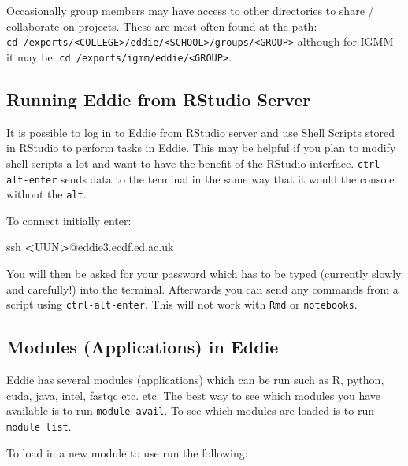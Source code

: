 \documentclass[]{book}
\newenvironment{Shaded}{\begin{snugshade}}{\end{snugshade}}
\newcommand{\FunctionTok}[1]{\textcolor[rgb]{0.00,0.00,0.00}{#1}}
\newcommand{\NormalTok}[1]{#1}
\newcommand{\OperatorTok}[1]{\textcolor[rgb]{0.81,0.36,0.00}{\textbf{#1}}}
\begin{document}
Occasionally group members may have access to other directories to share / collaborate on projects. These are most often found at the path: \texttt{cd\ /exports/\textless{}COLLEGE\textgreater{}/eddie/\textless{}SCHOOL\textgreater{}/groups/\textless{}GROUP\textgreater{}} although for IGMM it may be: \texttt{cd\ /exports/igmm/eddie/\textless{}GROUP\textgreater{}}.

\hypertarget{running-eddie-from-rstudio-server}{%
\subsection{Running Eddie from RStudio Server}\label{running-eddie-from-rstudio-server}}

It is possible to log in to Eddie from RStudio server and use Shell Scripts stored in RStudio to perform tasks in Eddie. This may be helpful if you plan to modify shell scripts a lot and want to have the benefit of the RStudio interface. \texttt{ctrl-alt-enter} sends data to the terminal in the same way that it would the console without the \texttt{alt}.

To connect initially enter:

\begin{Shaded}
\begin{Highlighting}[]
\FunctionTok{ssh} \OperatorTok{<}\NormalTok{UUN}\OperatorTok{>}\NormalTok{@eddie3.ecdf.ed.ac.uk}
\end{Highlighting}
\end{Shaded}

You will then be asked for your password which has to be typed (currently slowly and carefully!) into the terminal. Afterwards you can send any commands from a script using \texttt{ctrl-alt-enter}. This will not work with \texttt{Rmd} or \texttt{notebooks}.

\hypertarget{modules-applications-in-eddie}{%
\subsection{Modules (Applications) in Eddie}\label{modules-applications-in-eddie}}

Eddie has several modules (applications) which can be run such as R, python, cuda, java, intel, fastqc etc. etc. The best way to see which modules you have available is to run \texttt{module\ avail}. To see which modules are loaded is to run \texttt{module\ list}.

To load in a new module to use run the following:
\end{document}
